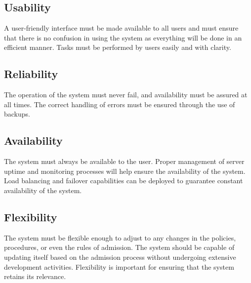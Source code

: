 \subsection{Usability}
A user-friendly interface must be made available to all users and must ensure that there is no confusion in using the system as everything will be done in an efficient manner. Tasks must be performed by users easily and with clarity.

\subsection{Reliability}
The operation of the system must never fail, and availability must be assured at all times. The correct handling of errors must be ensured through the use of backups.

\subsection{Availability}
The system must always be available to the user. Proper management of server uptime and monitoring processes will help ensure the availability of the system. Load balancing and failover capabilities can be deployed to guarantee constant availability of the system.

\subsection{Flexibility}
The system must be flexible enough to adjust to any changes in the policies, procedures, or even the rules of admission. The system should be capable of updating itself based on the admission process without undergoing extensive development activities. Flexibility is important for ensuring that the system retains its relevance.

